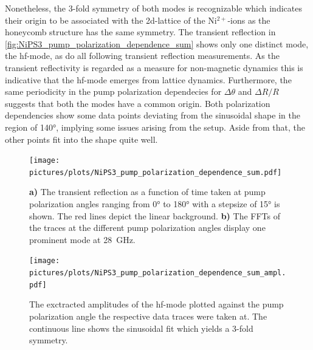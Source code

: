 Nonetheless, the 3-fold symmetry of both modes is recognizable which indicates their origin to be associated with the 2d-lattice of the Ni$^{2+}$-ions as the honeycomb structure has the same symmetry.
The transient reflection in \autoref{fig:NiPS3_pump_polarization_dependence_sum} shows only one distinct mode, the hf-mode, as do all following transient reflection measurements.
As the transient reflectivity is regarded as a measure for non-magnetic dynamics this is indicative that the hf-mode emerges from lattice dynamics.
Furthermore, the same periodicity in the pump polarization dependecies for $\Delta \theta$ and $\Delta R / R$ suggests that both the modes have a common origin.
Both polarization dependencies show some data points deviating from the sinusoidal shape in the region of 140°, implying some issues arising from the setup.
Aside from that, the other points fit into the shape quite well.
\begin{figure}[hbt!]
    \centering
    \texttt{[image: pictures/plots/NiPS3\_pump\_polarization\_dependence\_sum.pdf]} \vspace{-0.3cm}
    \caption{\textbf{a)} The transient reflection as a function of time taken at pump polarization angles ranging from 0° to 180° with a stepsize of 15° is shown. The red lines depict the linear background. \textbf{b)} The FFTs of the traces at the different pump polarization angles display one prominent mode at \qty{28}{GHz}.}
    \label{fig:NiPS3_pump_polarization_dependence_sum}
\end{figure}
\begin{figure}[hbt!]
    \centering  
    \texttt{[image: pictures/plots/NiPS3\_pump\_polarization\_dependence\_sum\_ampl.pdf]} \vspace{-0.3cm}
    \caption{The exctracted amplitudes of the hf-mode plotted against the pump polarization angle the respective data traces were taken at. The continuous line shows the sinusoidal fit which yields a 3-fold symmetry.}
    \label{fig:NiPS3_pump_polarization_dependence_sum_ampl}
\end{figure}
\FloatBarrier

\newpage
